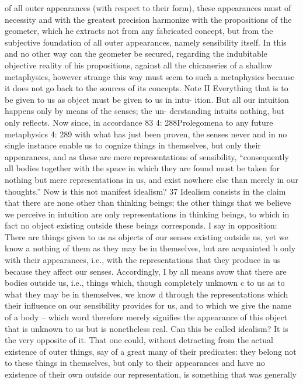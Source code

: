 of all outer appearances (with respect to their form), these appearances
must of necessity and with the greatest precision harmonize with the
propositions of the geometer, which he extracts not from any fabricated
concept, but from the subjective foundation of all outer appearances,
namely sensibility itself. In this and no other way can the geometer be
secured, regarding the indubitable objective reality of his propositions,
against all the chicaneries of a shallow metaphysics, however strange this
way must seem to such a metaphysics because it does not go back to the
sources of its concepts.
Note II
Everything that is to be given to us as object must be given to us in intu-
ition. But all our intuition happens only by means of the senses; the un-
derstanding intuits nothing, but only reﬂects. Now since, in accordance
83
4: 288Prolegomena to any future metaphysics
4: 289
with what has just been proven, the senses never and in no single instance
enable us to cognize things in themselves, but only their appearances,
and as these are mere representations of sensibility, “consequently all
bodies together with the space in which they are found must be taken
for nothing but mere representations in us, and exist nowhere else than
merely in our thoughts.” Now is this not manifest idealism? 37
Idealism consists in the claim that there are none other than thinking
beings; the other things that we believe we perceive in intuition are only
representations in thinking beings, to which in fact no object existing
outside these beings corresponds. I say in opposition: There are things
given to us as objects of our senses existing outside us, yet we know a
nothing of them as they may be in themselves, but are acquainted b only
with their appearances, i.e., with the representations that they produce
in us because they affect our senses. Accordingly, I by all means avow
that there are bodies outside us, i.e., things which, though completely
unknown c to us as to what they may be in themselves, we know d through
the representations which their inﬂuence on our sensibility provides for
us, and to which we give the name of a body – which word therefore
merely signiﬁes the appearance of this object that is unknown to us but
is nonetheless real. Can this be called idealism? It is the very opposite of it.
That one could, without detracting from the actual existence of outer
things, say of a great many of their predicates: they belong not to these
things in themselves, but only to their appearances and have no existence
of their own outside our representation, is something that was generally
